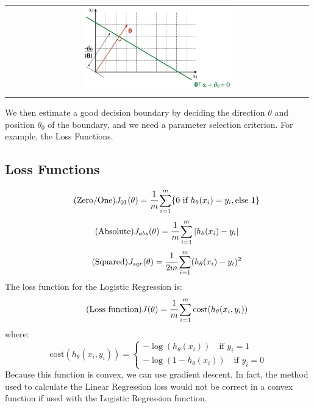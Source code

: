 \begin{center}
    \begin{tabular}{c}
        \\ \includegraphics[width=0.5\textwidth]{images/Classification2.png} \\ \\
    \end{tabular}
\end{center}
We then estimate a good decision boundary by deciding the direction $\theta$ and position $\theta_0$ of the boundary, and we need a parameter selection criterion. For example, the Loss Functions.

\subsection{Loss Functions}
\begin{equation} \tag{Zero/One}
    J_{01}(\theta) = \cfrac{1}{m} \sum_{i=1}^m \{ 0 \text{ if } h_\theta(x_i) = y_i, \text{else } 1 \}
\end{equation}
\begin{equation} \tag{Absolute}
    J_{abs}(\theta) = \cfrac{1}{m} \sum_{i=1}^m | h_\theta(x_i) - y_i |
\end{equation}
\begin{equation} \tag{Squared}
    J_{sqr}(\theta) = \cfrac{1}{2m} \sum_{i=1}^m (h_\theta(x_i) - y_i )^2
\end{equation}
The loss function for the Logistic Regression is:
\begin{equation} \tag{Loss function}
    J(\theta) = \cfrac{1}{m} \sum_{i=1}^m \text{cost}(h_\theta(x_i, y_i))
\end{equation}
where:
\begin{equation} \tag*{}
    \text{cost}(h_\theta(x_i, y_i)) =
    \begin{cases}
        -\log(h_\theta(x_i)) \quad \text{if } y_i = 1 \\
        -\log(1 - h_\theta(x_i)) \quad \text{if } y_i = 0
    \end{cases}
\end{equation}
Because this function is convex, we can use gradient descent. In fact, the method used to calculate the Linear Regression loss would not be correct in a convex function if used with the Logistic Regression function.

\newpage